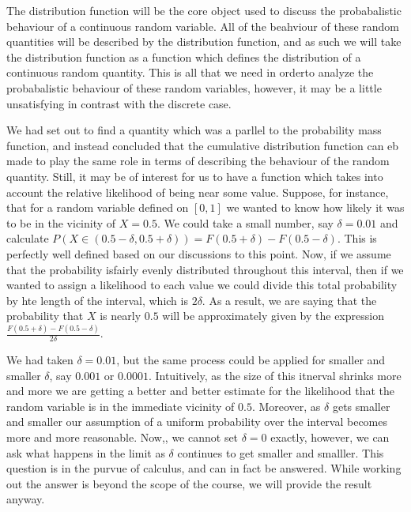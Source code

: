 \documentclass[
  letterpaper,
  DIV=11,
  numbers=noendperiod]{scrreprt}
\begin{document}
The distribution function will be the core object used to discuss the
probabalistic behaviour of a continuous random variable. All of the
beahviour of these random quantities will be described by the
distribution function, and as such we will take the distribution
function as a function which defines the distribution of a continuous
random quantity. This is all that we need in orderto analyze the
probabalistic behaviour of these random variables, however, it may be a
little unsatisfying in contrast with the discrete case.

We had set out to find a quantity which was a parllel to the probability
mass function, and instead concluded that the cumulative distribution
function can eb made to play the same role in terms of describing the
behaviour of the random quantity. Still, it may be of interest for us to
have a function which takes into account the relative likelihood of
being near some value. Suppose, for instance, that for a random variable
defined on \([0,1]\) we wanted to know how likely it was to be in the
vicinity of \(X=0.5\). We could take a small number, say
\(\delta = 0.01\) and calculate
\(P(X\in(0.5-\delta,0.5+\delta)) = F(0.5+\delta)-F(0.5-\delta)\). This
is perfectly well defined based on our discussions to this point. Now,
if we assume that the probability isfairly evenly distributed throughout
this interval, then if we wanted to assign a likelihood to each value we
could divide this total probability by hte length of the interval, which
is \(2\delta\). As a result, we are saying that the probability that
\(X\) is nearly \(0.5\) will be approximately given by the expression
\(\frac{F(0.5+\delta)-F(0.5-\delta)}{2\delta}\).

We had taken \(\delta=0.01\), but the same process could be applied for
smaller and smaller \(\delta\), say \(0.001\) or \(0.0001\).
Intuitively, as the size of this itnerval shrinks more and more we are
getting a better and better estimate for the likelihood that the random
variable is in the immediate vicinity of \(0.5\). Moreover, as
\(\delta\) gets smaller and smaller our assumption of a uniform
probability over the interval becomes more and more reasonable. Now,, we
cannot set \(\delta=0\) exactly, however, we can ask what happens in the
limit as \(\delta\) continues to get smaller and smalller. This question
is in the purvue of calculus, and can in fact be answered. While working
out the answer is beyond the scope of the course, we will provide the
result anyway.
\end{document}
